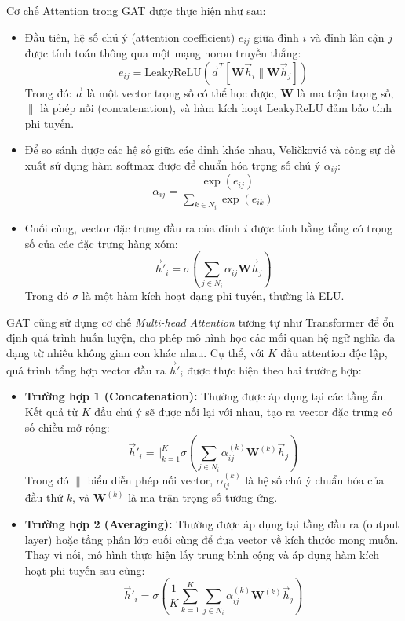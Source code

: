 Cơ chế Attention trong GAT được thực hiện như sau:
\begin{itemize}[label={--}, itemsep=1pt]
    \item Đầu tiên, hệ số chú ý (attention coefficient) $e_{ij}$ giữa đỉnh $i$ và đỉnh lân cận $j$ được tính toán thông qua một mạng noron truyền thẳng:
    \[
        e_{ij} = \text{LeakyReLU}\left( \vec{a}^T [\mathbf{W}\vec{h}_i \| \mathbf{W}\vec{h}_j] \right)
    \]
    Trong đó: $\vec{a}$ là một vector trọng số có thể học được, $\mathbf{W}$ là ma trận trọng số, $\|$ là phép nối (concatenation), và hàm kích hoạt LeakyReLU đảm bảo tính phi tuyến.

    \item Để so sánh được các hệ số giữa các đỉnh khác nhau, Veličković và cộng sự đề xuất sử dụng hàm softmax được để chuẩn hóa trọng số chú ý $\alpha_{ij}$:
    \[
        \alpha_{ij} = \frac{\exp(e_{ij})}{\sum_{k \in N_i} \exp(e_{ik})}
    \]
    
    \item Cuối cùng, vector đặc trưng đầu ra của đỉnh $i$ được tính bằng tổng có trọng số của các đặc trưng hàng xóm:
    \[
        \vec{h}'_i = \sigma \left( \sum_{j \in N_i} \alpha_{ij} \mathbf{W}\vec{h}_j \right)
    \]
    Trong đó $\sigma$ là một hàm kích hoạt dạng phi tuyến, thường là ELU.
\end{itemize}

GAT cũng sử dụng cơ chế \textit{Multi-head Attention} tương tự như Transformer để ổn định quá trình huấn luyện, cho phép mô hình học các mối quan hệ ngữ nghĩa đa dạng từ nhiều không gian con khác nhau. Cụ thể, với $K$ đầu attention độc lập, quá trình tổng hợp vector đầu ra $\vec{h}'_i$ được thực hiện theo hai trường hợp:

\begin{itemize}[label={--}, itemsep=5pt]
    \item \textbf{Trường hợp 1 (Concatenation):} Thường được áp dụng tại các tầng ẩn. Kết quả từ $K$ đầu chú ý sẽ được nối lại với nhau, tạo ra vector đặc trưng có số chiều mở rộng:
    \[
        \vec{h}'_i = \Bigg\Vert_{k=1}^K \sigma \left( \sum_{j \in {N}_i} \alpha_{ij}^{(k)} \mathbf{W}^{(k)}\vec{h}_j \right)
    \]
    Trong đó $\|$ biểu diễn phép nối vector, $\alpha_{ij}^{(k)}$ là hệ số chú ý chuẩn hóa của đầu thứ $k$, và $\mathbf{W}^{(k)}$ là ma trận trọng số tương ứng.

    \item \textbf{Trường hợp 2 (Averaging):} Thường được áp dụng tại tầng đầu ra (output layer) hoặc tầng phân lớp cuối cùng để đưa vector về kích thước mong muốn. Thay vì nối, mô hình thực hiện lấy trung bình cộng và áp dụng hàm kích hoạt phi tuyến sau cùng:
    \[
        \vec{h}'_i = \sigma \left( \frac{1}{K} \sum_{k=1}^K \sum_{j \in {N}_i} \alpha_{ij}^{(k)} \mathbf{W}^{(k)}\vec{h}_j \right)
    \]
\end{itemize}